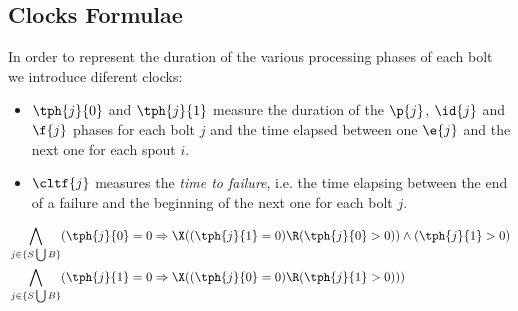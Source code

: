 %
%
%

%
\newpage
\subsection*{Clocks Formulae}
In order to represent the duration of the various processing phases of each bolt we introduce diferent clocks:
\begin{itemize}
	\item \textbf{$ \tph{j}{0} $} and \textbf{$ \tph{j}{1} $} measure the duration of the $ \p{j} $, $ \id{j} $ and $ \f{j} $ phases for each bolt $ j $ and the time elapsed between one $ \e{j} $ and the next one for each spout $ i $.
	\item \textbf{$ \cltf{j} $} measures the \textit{time to failure}, i.e. the time elapsing between the end of a failure and the beginning of the next one for each bolt $ j $.
\end{itemize}

\begin{align*}
%
& \bigwedge_{
	\begin{subarray}{c}
	j \in \{ S \bigcup  B \}\\
	\end{subarray}
	}
	(\tph{j}{0} =  0 \Rightarrow \X((\tph{j}{1} = 0) \R (\tph{j}{0}>0)) \land (\tph{j}{1} > 0) \\
	& \bigwedge_{
	\begin{subarray}{c}
	j \in \{ S \bigcup  B \}\\
	\end{subarray}
	}
	(\tph{j}{1} =  0 \Rightarrow \X((\tph{j}{0} = 0) \R (\tph{j}{1}>0)))	
		\end{align*}

